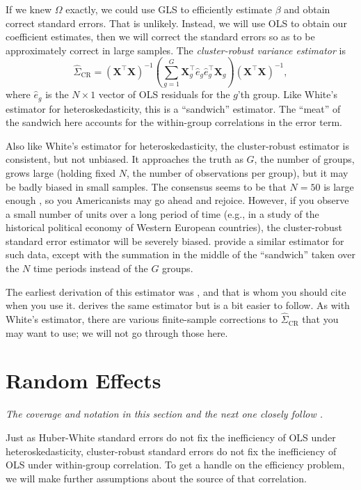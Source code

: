 \documentclass[
  12pt,
  oneside,openany]{book}
\begin{document}
If we knew \(\Omega\) exactly, we could use GLS to efficiently estimate \(\beta\) and obtain correct standard errors. That is unlikely. Instead, we will use OLS to obtain our coefficient estimates, then we will correct the standard errors so as to be approximately correct in large samples. The \emph{cluster-robust variance estimator} is
\[
\hat{\Sigma}_{\text{CR}} =
(\mathbf{X}^\top \mathbf{X})^{-1}
\left( \sum_{g=1}^G \mathbf{X}_g^\top \hat{e}_g \hat{e}_g^\top \mathbf{X}_g \right)
(\mathbf{X}^\top \mathbf{X})^{-1},
\]
where \(\hat{e}_g\) is the \(N \times 1\) vector of OLS residuals for the \(g\)'th group. Like White's estimator for heteroskedasticity, this is a ``sandwich'' estimator. The ``meat'' of the sandwich here accounts for the within-group correlations in the error term.

Also like White's estimator for heteroskedasticity, the cluster-robust estimator is consistent, but not unbiased. It approaches the truth as \(G\), the number of groups, grows large (holding fixed \(N\), the number of observations per group), but it may be badly biased in small samples. The consensus seems to be that \(N = 50\) is large enough \citep{Cameron:2015ud}, so you Americanists may go ahead and rejoice. However, if you observe a small number of units over a long period of time (e.g., in a study of the historical political economy of Western European countries), the cluster-robust standard error estimator will be severely biased. \citet{Beck:1995hm} provide a similar estimator for such data, except with the summation in the middle of the ``sandwich'' taken over the \(N\) time periods instead of the \(G\) groups.

The earliest derivation of this estimator was \citet{Liang:1986gv}, and that is whom you should cite when you use it. \citet{Arellano:1987jx} derives the same estimator but is a bit easier to follow. As with White's estimator, there are various finite-sample corrections to \(\hat{\Sigma}_{\text{CR}}\) that you may want to use; we will not go through those here.

\hypertarget{random-effects}{%
\section{Random Effects}\label{random-effects}}

\emph{The coverage and notation in this section and the next one closely follow \citet[chapter 12]{Johnston:1997um}.}

Just as Huber-White standard errors do not fix the inefficiency of OLS under heteroskedasticity, cluster-robust standard errors do not fix the inefficiency of OLS under within-group correlation. To get a handle on the efficiency problem, we will make further assumptions about the source of that correlation.
\end{document}
